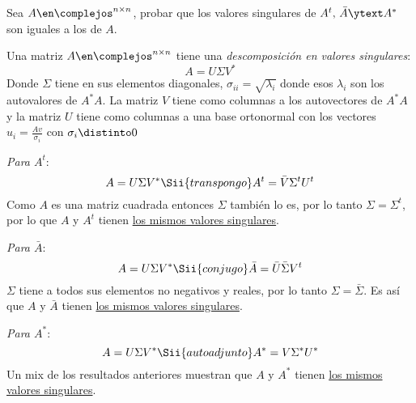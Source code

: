 \begin{enunciado}{\ejercicio}
  Sea $A \en \complejos^{n \times n}$, probar que los valores singulares de $A^t,\, \bar{A} \ytext A^*$ son
  iguales a los de $A$.
\end{enunciado}

Una matriz $A \en \complejos^{n \times n}$ tiene una \textit{descomposición en valores singulares}:
$$
  A = U \Sigma V^*
$$
Donde $\Sigma$ tiene en sus elementos diagonales, $\sigma_{ii} = \sqrt{\lambda_i}$ donde esos $\lambda_i$
son los autovalores de $A^* A$.
La matriz $V$ tiene como columnas a los autovectores de $A^*A$ y
la matriz $U$ tiene como columnas a una base ortonormal con los vectores $u_i = \frac{Av}{\sigma_i}$ con $\sigma_i \distinto 0$

\bigskip

\textit{Para $A^t$}:
$$
  A = U \Sigma V^*
  \Sii{transpongo}
  A^t = \bar{V} \Sigma^t U^t
$$
Como $A$ es una matriz cuadrada entonces $\Sigma$ también lo es, por lo tanto $\Sigma = \Sigma^t$, por lo que
$A$ y $A^t$ tienen \ul{los mismos valores singulares}.

\bigskip

\textit{Para $\bar{A}$}:
$$
  A = U \Sigma V^*
  \Sii{conjugo}
  \bar{A} = \bar{U} \bar{\Sigma} V^t
$$
$\Sigma$ tiene a todos sus elementos no negativos y reales, por lo tanto $\Sigma = \bar{\Sigma}$.
Es así que $A$ y $\bar{A}$ tienen \ul{los mismos valores singulares}.

\bigskip

\textit{Para $A^*$}:
$$
  A = U \Sigma V^*
  \Sii{autoadjunto}
  A^* = V \Sigma^* U^*
$$
Un mix de los resultados anteriores muestran que $A$ y $A^*$ tienen \ul{los mismos valores singulares}.

\begin{aportes}
  \item {}
\end{aportes}
